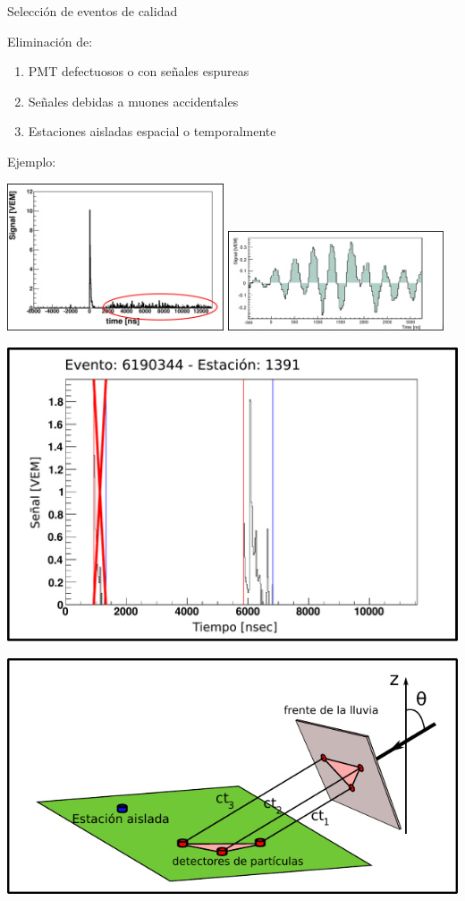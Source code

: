 \begin{frame}{Selecci\'on de eventos de calidad}
\begin{block}{Eliminaci\'on de:}
 \begin{enumerate}[<alert@+|+->]
  \item PMT defectuosos o con se\~nales espureas
  \item Se\~nales debidas a muones accidentales
  \item Estaciones aisladas espacial o temporalmente
 \end{enumerate}
\end{block}

	\begin{exampleblock}{Ejemplo:}
	\begin{overprint}
	\centerline{\includegraphics[width=0.48\textwidth]{fig/seleccionAuger/pmt2_border}\hspace*{2mm}
	\includegraphics[width=0.48\textwidth]{fig/seleccionAuger/lighting}}
	\centerline{\includegraphics[height=0.35\textwidth]{fig/seleccionAuger/badStartTime_2}}
	\centerline{\includegraphics[height=0.35\textwidth]{fig/seleccionAuger/geome2}}
	\end{overprint}
	\end{exampleblock}
\end{frame}


